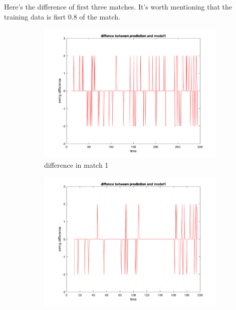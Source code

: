 Here's the difference of first three matches. It's worth mentioning that the training data
is fisrt 0.8 of the match.

\begin{figure}[H]
    \centering
    \begin{subfigure}[b]{0.34\textwidth}
        \includegraphics[width=\linewidth]{mainmatter/imgs/swing_diff_match1_overfit.png}
        \caption{difference in match 1}
    \end{subfigure}\hspace{-0.02\textwidth}
    \begin{subfigure}[b]{0.34\textwidth}
        \includegraphics[width=\linewidth]{mainmatter/imgs/swing_diff_match2_overfit.png}

\end{subfigure}
\end{figure}
